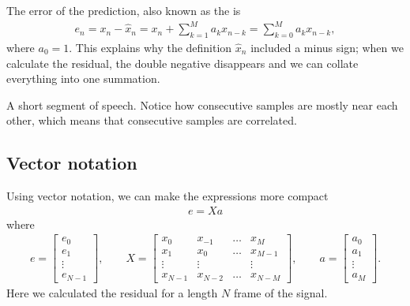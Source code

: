 \documentclass[letterpaper,10pt,english]{jupyterBook}
\begin{document}
\sphinxAtStartPar
The error of the prediction, also known as the  is
\begin{equation*}
\begin{split} e_n = x_n - \hat x_n = x_n + \sum_{k=1}^M a_k x_{n-k} =
\sum_{k=0}^M a_k x_{n-k}, \end{split}
\end{equation*}
\sphinxAtStartPar
where \(a_{0}=1\). This explains why the definition \( \hat x_n
\) included a minus sign; when we calculate the residual, the double
negative disappears and we can collate everything into one summation.

\sphinxAtStartPar
A short segment of speech. Notice how consecutive samples are mostly
near each other, which means that consecutive samples are correlated.

\sphinxAtStartPar
{}


\subsection{Vector notation}
\label{\detokenize{Representations/Linear_prediction:vector-notation}}
\sphinxAtStartPar
Using vector notation, we can make the expressions more compact
\begin{equation*}
\begin{split} e = Xa \end{split}
\end{equation*}
\sphinxAtStartPar
where
\begin{equation*}
\begin{split} e =
\begin{bmatrix}e_0\\e_1\\\vdots\\e_{N-1}\end{bmatrix},\qquad
X = \begin{bmatrix}x_0 & x_{-1} & \dots & x_{M} \\x_1 & x_0 &
\dots & x_{M-1} \\ \vdots & \vdots & & \vdots \\ x_{N-1} &
x_{N-2} & \dots & x_{N-M} \end{bmatrix}, \qquad a =
\begin{bmatrix}a_0\\a_1\\\vdots\\a_{M}\end{bmatrix}. \end{split}
\end{equation*}
\sphinxAtStartPar
Here we calculated the residual for a length \(N\) frame of the signal.
\end{document}
